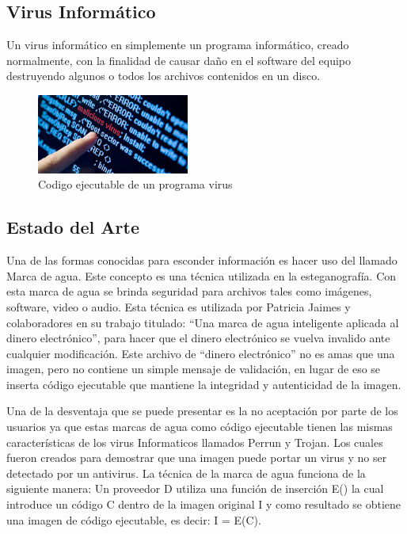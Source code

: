 \documentclass[12pt]{article}
\begin{document}
\subsection{Virus Informático}
Un virus informático en simplemente un programa informático, creado normalmente, con la finalidad de causar daño en el software del equipo destruyendo algunos o todos los archivos contenidos en un disco.\cite{Pardo}
\newline
\begin{figure}[hbtp]
\centering
\includegraphics[width = 5cm]{virus.jpeg}
\caption{Codigo ejecutable de un programa virus}
\end{figure}

\subsection{Estado del Arte}
Una de las formas conocidas para esconder información es hacer uso del llamado Marca de agua. Este concepto es una técnica utilizada en la esteganografía. Con esta marca de agua se brinda seguridad para archivos tales como imágenes, software, video o audio. Esta técnica es utilizada por Patricia Jaimes y colaboradores en su trabajo titulado: “Una marca de agua inteligente aplicada al dinero electrónico”, para hacer que el dinero electrónico se vuelva invalido ante cualquier modificación. Este archivo de “dinero electrónico” no es amas que una imagen, pero no contiene un simple mensaje de validación, en lugar de eso se inserta código ejecutable que mantiene la integridad y autenticidad de la imagen.

Una de la desventaja que se puede presentar es la no aceptación por parte de los usuarios ya que estas marcas de agua como código ejecutable tienen las mismas características de los virus Informaticos llamados Perrun y Trojan. Los cuales fueron creados para demostrar que una imagen puede portar un virus y no ser detectado por un antivirus.
La técnica  de la marca de agua funciona de la siguiente manera: Un proveedor D utiliza una función de inserción E() la cual introduce un código C dentro de la imagen original I y como resultado se obtiene una imagen de código ejecutable, es decir: I = E(C).\cite{Jaimes}
\end{document}
